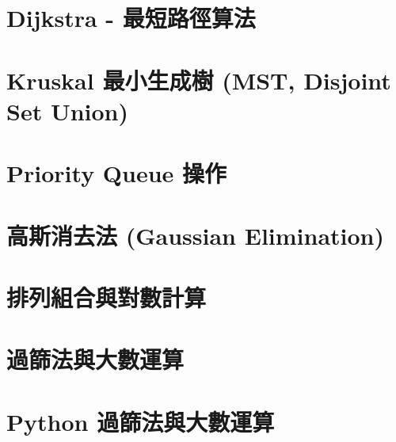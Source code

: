 \documentclass{article}
\begin{document}
\begin{multicols}{2}


\section{Dijkstra - 最短路徑算法}



\section{Kruskal 最小生成樹 (MST, Disjoint Set Union)}



\section{Priority Queue 操作}



\section{高斯消去法 (Gaussian Elimination)}



\section{排列組合與對數計算}



\section{過篩法與大數運算}



\section{Python 過篩法與大數運算}




\end{multicols}
\end{document}
